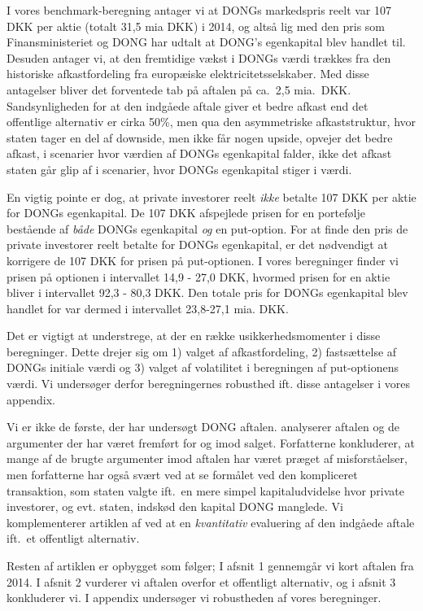 \documentclass{article}
\begin{document}
I vores benchmark-beregning antager vi at DONGs markedspris reelt var 107 DKK per aktie (totalt 31,5 mia DKK) i 2014, og altså lig med den pris som  Finansministeriet og DONG har udtalt at DONG's egenkapital blev handlet til. Desuden antager vi, at den fremtidige vækst i DONGs værdi trækkes fra den historiske afkastfordeling fra europæiske elektricitetsselskaber. Med disse antagelser bliver det forventede tab på aftalen på ca.\ 2,5 mia.\ DKK. Sandsynligheden for at den indgåede aftale giver et bedre afkast end det offentlige alternativ er cirka 50\%, men qua den asymmetriske afkaststruktur, hvor staten tager en del af downside, men ikke får nogen upside, opvejer det bedre afkast, i scenarier hvor værdien af DONGs egenkapital falder, ikke det afkast staten går glip af i  scenarier, hvor DONGs egenkapital stiger i værdi.

En vigtig pointe er dog, at private investorer reelt \emph{ikke} betalte 107 DKK per aktie for DONGs egenkapital. De 107 DKK afspejlede prisen for en portefølje bestående af \emph{både} DONGs egenkapital \emph{og} en put-option. For at finde den pris de private investorer reelt betalte for DONGs egenkapital, er det nødvendigt at korrigere de 107 DKK for prisen på put-optionen. I vores beregninger finder vi prisen på optionen i intervallet 14,9 - 27,0 DKK, hvormed prisen for en aktie bliver i intervallet 92,3 - 80,3 DKK. Den totale pris for DONGs egenkapital blev handlet for var dermed i intervallet 23,8-27,1 mia. DKK.

Det er vigtigt at understrege, at der en række usikkerhedsmomenter i disse beregninger. Dette drejer sig om 1) valget af afkastfordeling, 2) fastsættelse af DONGs initiale værdi og 3) valget af volatilitet i beregningen af put-optionens værdi. Vi undersøger derfor beregningernes robusthed ift. disse antagelser i vores appendix.

Vi er ikke de første, der har undersøgt DONG aftalen. \cite{Bachman2014} analyserer aftalen og de argumenter der har været fremført for og imod salget. Forfatterne konkluderer, at mange af de brugte argumenter imod aftalen har været præget af misforståelser, men forfatterne har også svært ved at se formålet ved den kompliceret transaktion, som staten valgte ift.\ en mere simpel kapitaludvidelse hvor private investorer, og evt. staten, indskød den kapital DONG manglede. Vi komplementerer artiklen af \cite{Bachman2014} ved at en \emph{kvantitativ} evaluering af den indgåede aftale ift.\ et offentligt alternativ. 

Resten af artiklen er opbygget som følger; I afsnit 1 gennemgår vi kort aftalen fra 2014. I afsnit 2 vurderer vi aftalen overfor et offentligt alternativ, og i afsnit 3 konkluderer vi. I appendix undersøger vi robustheden af vores beregninger. 
\end{document}
